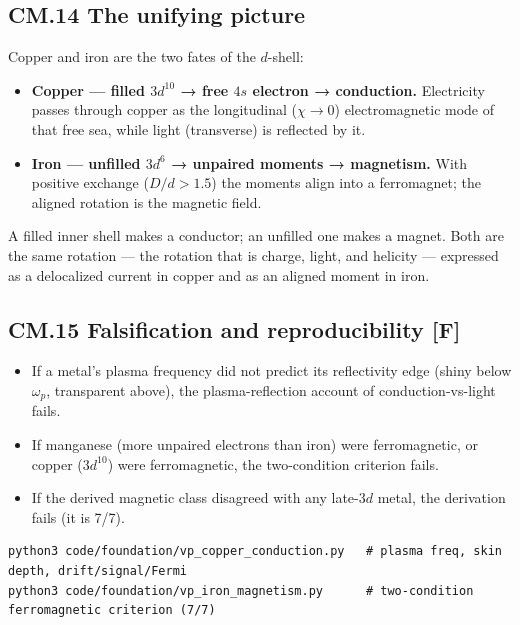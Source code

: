 \documentclass[
  10pt,
]{article}
\providecommand{\tightlist}{%
  \setlength{\itemsep}{0pt}\setlength{\parskip}{0pt}}
\begin{document}
\hypertarget{cm.14-the-unifying-picture}{%
\subsection{CM.14 The unifying
picture}\label{cm.14-the-unifying-picture}}

Copper and iron are the two fates of the \(d\)-shell:

\begin{itemize}
\tightlist
\item
  \textbf{Copper --- filled \(3d^{10}\) → free \(4s\) electron →
  conduction.} Electricity passes through copper as the longitudinal
  (\(\chi\to 0\)) electromagnetic mode of that free sea, while light
  (transverse) is reflected by it.
\item
  \textbf{Iron --- unfilled \(3d^6\) → unpaired moments → magnetism.}
  With positive exchange (\(D/d>1.5\)) the moments align into a
  ferromagnet; the aligned rotation is the magnetic field.
\end{itemize}

A filled inner shell makes a conductor; an unfilled one makes a magnet.
Both are the same rotation --- the rotation that is charge, light, and
helicity --- expressed as a delocalized current in copper and as an
aligned moment in iron.

\hypertarget{cm.15-falsification-and-reproducibility-f}{%
\subsection{\texorpdfstring{CM.15 Falsification and reproducibility
\textbf{{[}F{]}}}{CM.15 Falsification and reproducibility {[}F{]}}}\label{cm.15-falsification-and-reproducibility-f}}

\begin{itemize}
\tightlist
\item
  If a metal's plasma frequency did not predict its reflectivity edge
  (shiny below \(\omega_p\), transparent above), the plasma-reflection
  account of conduction-vs-light fails.
\item
  If manganese (more unpaired electrons than iron) were ferromagnetic,
  or copper (\(3d^{10}\)) were ferromagnetic, the two-condition
  criterion fails.
\item
  If the derived magnetic class disagreed with any late-\(3d\) metal,
  the derivation fails (it is 7/7).
\end{itemize}

\begin{verbatim}
python3 code/foundation/vp_copper_conduction.py   # plasma freq, skin depth, drift/signal/Fermi
python3 code/foundation/vp_iron_magnetism.py      # two-condition ferromagnetic criterion (7/7)
\end{verbatim}
\end{document}
